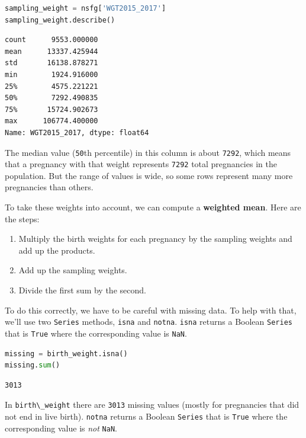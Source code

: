 \begin{lstlisting}[language=Python,style=source]
sampling_weight = nsfg['WGT2015_2017']
sampling_weight.describe()
\end{lstlisting}

\begin{lstlisting}[style=output]
count      9553.000000
mean      13337.425944
std       16138.878271
min        1924.916000
25%        4575.221221
50%        7292.490835
75%       15724.902673
max      106774.400000
Name: WGT2015_2017, dtype: float64
\end{lstlisting}

The median value (\passthrough{\lstinline!50!}th percentile) in this
column is about \passthrough{\lstinline!7292!}, which means that a
pregnancy with that weight represents \passthrough{\lstinline!7292!}
total pregnancies in the population. But the range of values is wide, so
some rows represent many more pregnancies than others.

To take these weights into account, we can compute a \textbf{weighted
mean}. Here are the steps:

\begin{enumerate}
\def\labelenumi{\arabic{enumi}.}
\item
  Multiply the birth weights for each pregnancy by the sampling weights
  and add up the products.
\item
  Add up the sampling weights.
\item
  Divide the first sum by the second.
\end{enumerate}

To do this correctly, we have to be careful with missing data. To help
with that, we'll use two \passthrough{\lstinline!Series!} methods,
\passthrough{\lstinline!isna!} and \passthrough{\lstinline!notna!}.
\passthrough{\lstinline!isna!} returns a Boolean
\passthrough{\lstinline!Series!} that is \passthrough{\lstinline!True!}
where the corresponding value is \passthrough{\lstinline!NaN!}.

\begin{lstlisting}[language=Python,style=source]
missing = birth_weight.isna()
missing.sum()
\end{lstlisting}

\begin{lstlisting}[style=output]
3013
\end{lstlisting}

In \passthrough{\lstinline!birth\_weight!} there are
\passthrough{\lstinline!3013!} missing values (mostly for pregnancies
that did not end in live birth). \passthrough{\lstinline!notna!} returns
a Boolean \passthrough{\lstinline!Series!} that is
\passthrough{\lstinline!True!} where the corresponding value is
\emph{not} \passthrough{\lstinline!NaN!}.

